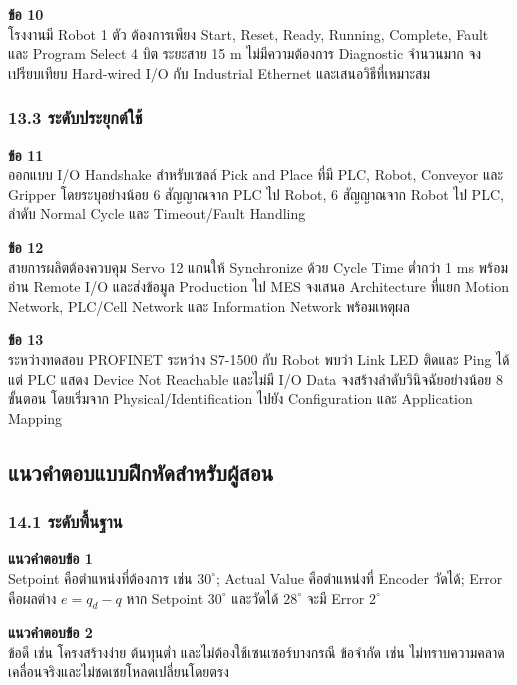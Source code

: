 \textbf{ข้อ 10} \\
โรงงานมี Robot 1 ตัว ต้องการเพียง Start, Reset, Ready, Running, Complete, Fault และ Program Select 4 บิต ระยะสาย 15 m ไม่มีความต้องการ Diagnostic จำนวนมาก จงเปรียบเทียบ Hard-wired I/O กับ Industrial Ethernet และเสนอวิธีที่เหมาะสม

\subsubsection{13.3 ระดับประยุกต์ใช้}

\textbf{ข้อ 11} \\
ออกแบบ I/O Handshake สำหรับเซลล์ Pick and Place ที่มี PLC, Robot, Conveyor และ Gripper โดยระบุอย่างน้อย 6 สัญญาณจาก PLC ไป Robot, 6 สัญญาณจาก Robot ไป PLC, ลำดับ Normal Cycle และ Timeout/Fault Handling

\textbf{ข้อ 12} \\
สายการผลิตต้องควบคุม Servo 12 แกนให้ Synchronize ด้วย Cycle Time ต่ำกว่า 1 ms พร้อมอ่าน Remote I/O และส่งข้อมูล Production ไป MES จงเสนอ Architecture ที่แยก Motion Network, PLC/Cell Network และ Information Network พร้อมเหตุผล

\textbf{ข้อ 13} \\
ระหว่างทดสอบ PROFINET ระหว่าง S7-1500 กับ Robot พบว่า Link LED ติดและ Ping ได้ แต่ PLC แสดง Device Not Reachable และไม่มี I/O Data จงสร้างลำดับวินิจฉัยอย่างน้อย 8 ขั้นตอน โดยเริ่มจาก Physical/Identification ไปยัง Configuration และ Application Mapping

\newpage

\subsection{แนวคำตอบแบบฝึกหัดสำหรับผู้สอน}

\subsubsection{14.1 ระดับพื้นฐาน}

\textbf{แนวคำตอบข้อ 1} \\
Setpoint คือตำแหน่งที่ต้องการ เช่น $30^\circ$; Actual Value คือตำแหน่งที่ Encoder วัดได้; Error คือผลต่าง $e=q_d-q$ หาก Setpoint $30^\circ$ และวัดได้ $28^\circ$ จะมี Error $2^\circ$

\textbf{แนวคำตอบข้อ 2} \\
ข้อดี เช่น โครงสร้างง่าย ต้นทุนต่ำ และไม่ต้องใช้เซนเซอร์บางกรณี ข้อจำกัด เช่น ไม่ทราบความคลาดเคลื่อนจริงและไม่ชดเชยโหลดเปลี่ยนโดยตรง

